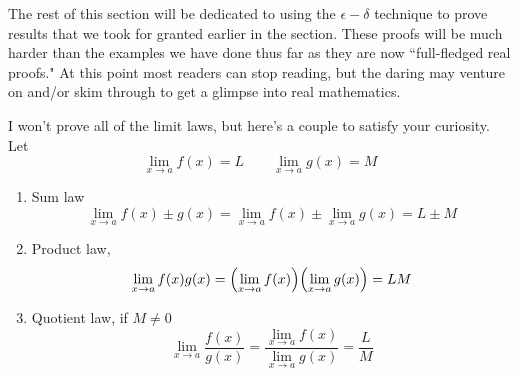 The rest of this section will be dedicated to using the $\epsilon-\delta$ technique to prove results that we took for granted earlier in the section. These proofs will be much harder than the examples we have done thus far as they are now ``full-fledged real proofs." At this point most readers can stop reading, but the daring may venture on and/or skim through to get a glimpse into real mathematics.

\begin{theorem}
	I won't prove all of the limit laws, but here's a couple to satisfy your curiosity. Let
	\[ \lim_{x \to a} f(x) = L \qquad \lim_{x \to a} g(x) = M \]
	\begin{enumerate}
		\item Sum law
		\[ \lim_{x \to a} f(x) \pm g(x) = \lim_{x \to a} f(x) \pm \lim_{x \to a} g(x) = L \pm M \]
		\item Product law,
		\[ \lim_{x \to a} f(x)g(x) = \qty(\lim_{x \to a} f(x)) \qty(\lim_{x \to a} g(x)) = LM \]
		\item Quotient law, if $M \neq 0$
		\[ \lim_{x \to a} \frac{f(x)}{g(x)} = \frac{\lim_{x \to a} f(x)}{\lim_{x \to a} g(x)} = \frac{L}{M} \]
	\end{enumerate}
\end{theorem}
\newpage 
